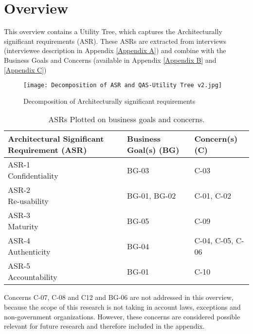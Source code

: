 \chapter{Overview}\label{s:overview}
This overview contains a Utility Tree, which captures the Architecturally significant requirements (ASR). These ASRs are extracted from interviews (interviewee description in Appendix  \ref{Appendix A}) and combine with the Business Goals and Concerns (available in Appendix \ref{Appendix B} and  \ref{Appendix C}) 

\graphicspath{ {./images/} }
\begin{figure}[t]
\texttt{[image: Decomposition of ASR and QAS-Utility Tree v2.jpg]}\\
\caption{Decomposition of Architecturally significant requirements}
\label{fig:ASR1}
\end{figure}

\begin{table}[h!]
\centering
\begin{tabular}{||l l l||} 
 \hline
 Architectural Significant Requirement (ASR) & Business Goal(s) (BG) & Concern(s) (C)\\ [0.5ex] 
 \hline\hline
 \makecell{ASR-1 \\ Confidentiality} & BG-03 & C-03 \\ 
 \hline
\makecell{ASR-2 \\ Re-usability} & BG-01, BG-02 & C-01, C-02  \\
  \hline
\makecell{ASR-3 \\ Maturity} & BG-05 &  C-09  \\
  \hline
\makecell{ASR-4 \\ Authenticity} & BG-04 & C-04, C-05, C-06 \\
  \hline
\makecell{ASR-5 \\ Accountability} & BG-01 & C-10  \\ [1ex] 
 \hline
\end{tabular}
\caption{ASRs Plotted on business goals and concerns.}
\label{ASR_BG_C}
\end{table}

Concerns C-07, C-08 and C12 and BG-06 are not addressed in this overview, because the scope of this research is not taking in account laws, exceptions and non-government organizations. However, these concerns are considered possible relevant for future research and therefore included in the appendix.

